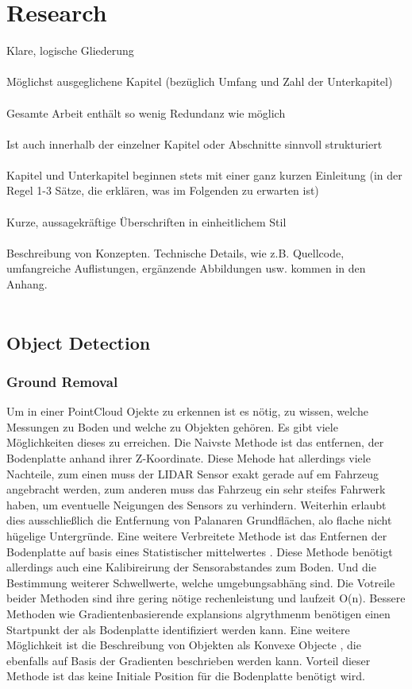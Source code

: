 \documentclass[11pt,oneside,openright]{mpreport}
\begin{document}
\chapter{Research}
Klare, logische Gliederung\\\\
Möglichst ausgeglichene Kapitel (bezüglich Umfang und Zahl der Unterkapitel)\\\\
Gesamte Arbeit enthält so wenig Redundanz wie möglich\\\\
Ist auch innerhalb der einzelner Kapitel oder Abschnitte sinnvoll strukturiert\\\\
Kapitel und Unterkapitel beginnen stets mit einer ganz kurzen Einleitung (in der Regel 1-3 Sätze, die erklären, was im Folgenden zu erwarten ist)\\\\
Kurze, aussagekräftige Überschriften in einheitlichem Stil\\\\
Beschreibung von Konzepten. Technische Details, wie z.B. Quellcode, umfangreiche Auflistungen, ergänzende Abbildungen usw. kommen in den Anhang.\\\\

\section{Object Detection}

\subsection{Ground Removal}
Um in einer PointCloud Ojekte zu erkennen ist es nötig, zu wissen, welche Messungen zu Boden und welche zu Objekten gehören. Es gibt viele Möglichkeiten dieses
zu erreichen. Die Naivste Methode ist das entfernen, der Bodenplatte anhand ihrer Z-Koordinate. Diese Mehode hat allerdings viele Nachteile, zum einen muss
der LIDAR Sensor exakt gerade auf em Fahrzeug angebracht werden, zum anderen muss das Fahrzeug ein sehr steifes Fahrwerk haben, um eventuelle Neigungen des Sensors zu verhindern.
Weiterhin erlaubt dies ausschließlich die Entfernung von Palanaren Grundflächen, alo flache nicht hügelige Untergründe. Eine weitere Verbreitete Methode ist das 
Entfernen der Bodenplatte auf basis eines Statistischer mittelwertes \cite{Zhang}.  Diese Methode benötigt allerdings auch eine Kalibireirung der Sensorabstandes zum Boden.
Und die Bestimmung weiterer Schwellwerte, welche umgebungsabhäng sind. Die Votreile beider Methoden sind ihre gering nötige rechenleistung und laufzeit O(n).
Bessere Methoden wie Gradientenbasierende explansions algrythmenm benötigen einen Startpunkt der als Bodenplatte identifiziert werden kann.
Eine weitere Möglichkeit ist die Beschreibung von Objekten als Konvexe Objecte \cite{5164280}, die ebenfalls auf Basis der Gradienten beschrieben werden kann.
Vorteil dieser Methode ist das keine Initiale Position für die Bodenplatte benötigt wird.
\end{document}
